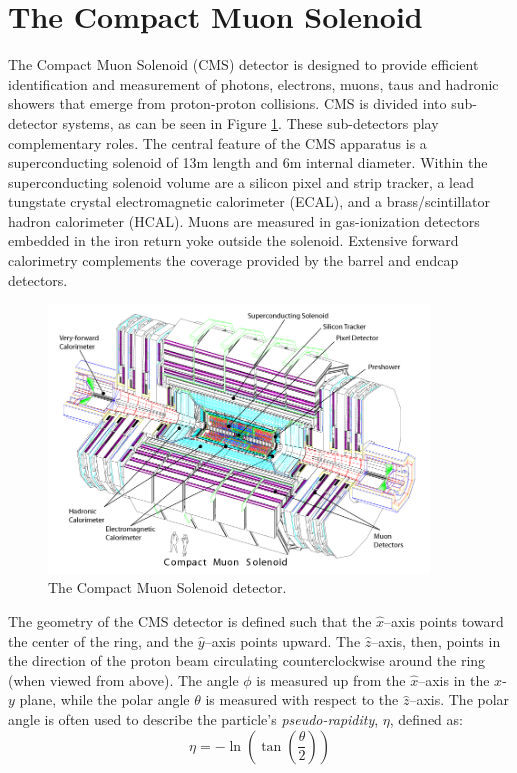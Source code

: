 \section{The Compact Muon Solenoid}

The Compact Muon Solenoid (CMS) detector is designed to provide efficient identification and 
measurement of photons, electrons, muons, taus and hadronic showers that emerge
from proton-proton collisions.
CMS is divided into sub-detector systems, as can be seen in Figure \ref{fig:cms_complete}.
These sub-detectors play complementary roles.
The central feature of the CMS apparatus is a superconducting solenoid of 13\unit{m} length and 6\unit{m} internal diameter. Within the superconducting solenoid volume are a silicon pixel and strip tracker, a lead tungstate crystal electromagnetic calorimeter (ECAL), and a brass/scintillator hadron calorimeter (HCAL). Muons are measured in gas-ionization detectors embedded in the iron return yoke outside the solenoid. Extensive forward calorimetry complements the coverage provided by the barrel and endcap detectors. 
\begin{figure}[htbp] 
\centering
\includegraphics[width=0.9\textwidth]{plots/intro/cms_complete.png}
\caption{The Compact Muon Solenoid detector.\label{fig:cms_complete}}
\end{figure}

The geometry of the CMS detector is defined such that the $\hat{x}$--axis points toward the
center of the ring, and the $\hat{y}$--axis points upward. The $\hat{z}$--axis, then, points in
the direction of the proton beam circulating counterclockwise around the ring (when viewed
from above). The angle $\phi$ is measured up from the $\hat{x}$--axis in the $x$-$y$ plane, while
the polar angle $\theta$ is measured with respect to the $\hat{z}$--axis. The polar angle is often used to describe
the particle's {\it pseudo-rapidity}, $\eta$, defined as:
\begin{equation}
\eta = -\ln\left(\tan\left(\frac{\theta}{2}\right)\right)
\end{equation}

